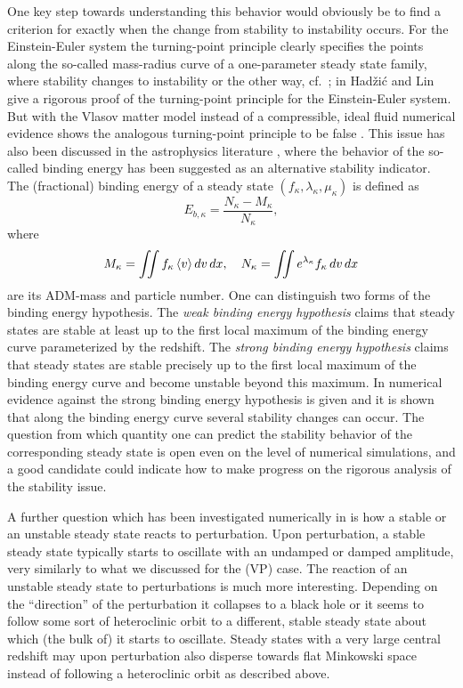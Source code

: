 \documentclass[11pt]{article}
\begin{document}
One key step towards understanding this behavior would obviously be to
find a criterion for exactly when the change from stability to instability
occurs. For the Einstein-Euler system the turning-point principle clearly
specifies the points along the so-called mass-radius curve of a one-parameter
steady state family, where stability changes to instability or the other way,
cf.~\cite{HaThWaWh,Mak,ScWa2014}; in \cite{HaLin}
{\sc Had\v zi\'c} and {\sc Lin} give a rigorous proof
of the turning-point principle for the Einstein-Euler system.
But with the Vlasov matter model
instead of a compressible, ideal fluid numerical evidence shows
the analogous turning-point principle
to be false \cite{Gue_e_a}.
This issue has also been discussed in the astrophysics literature
\cite{AbEtal1994, Fa1970, Ip69b,Ip1980,IT68, RaShTe1989_2,
  ShTe1985,ZeNo, ZePo},
where the behavior of the so-called binding energy has been suggested
as an alternative stability indicator.
The (fractional) binding energy of a steady state
$(f_\kappa,\lambda_\kappa,\mu_\kappa)$ is defined as
\[  
E_{b,\kappa} = \frac{N_\kappa-M_\kappa}{N_\kappa},
\] 
where
\[
M_\kappa =\iint f_\kappa \left\langle v\right\rangle dv\,dx,\quad
N_\kappa =\iint e^{\lambda_\kappa} f_\kappa\, dv\,dx
\]
are its ADM-mass and particle number. One can distinguish two forms
of the binding energy hypothesis.
The \textit{weak binding energy hypothesis} claims that steady states
are stable at least up to the first local maximum of the binding energy
curve parameterized by the redshift.
The \textit{strong binding energy hypothesis} claims that steady states
are stable precisely up to the first local maximum of the binding energy
curve and become unstable beyond this maximum. In \cite{GueStRe21}
numerical evidence against the strong binding energy hypothesis
is given and it is shown that along the binding energy curve
several stability changes can occur. The question from which quantity
one can predict the stability behavior of the corresponding
steady state is open even on the level of numerical simulations,
and a good candidate could indicate how to make progress
on the rigorous analysis of the stability issue.

A further question which has been investigated numerically in
\cite{AnRe1,Gue_e_a} is how a stable or an unstable steady state
reacts to perturbation. Upon perturbation, a stable steady state
typically starts to oscillate with an undamped or damped amplitude,
very similarly to what we discussed for the (VP) case. The
reaction of an unstable steady state to perturbations is much more
interesting. Depending on the ``direction'' of the perturbation
it collapses to a black hole or it seems to follow
some sort of heteroclinic orbit to a different, stable steady state about
which (the bulk of) it starts to oscillate. Steady states with a
very large central redshift
may upon perturbation also disperse towards flat Minkowski space
instead of following a heteroclinic orbit as described above.
\end{document}
